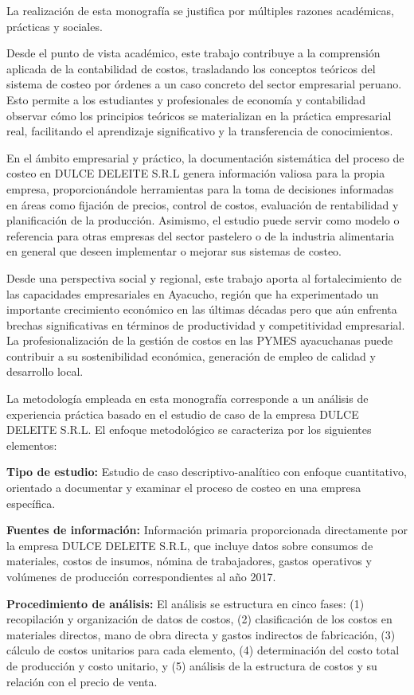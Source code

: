 \documentclass[
  stu,
  floatsintext,
  longtable,
  a4paper,
  nolmodern,
  notxfonts,
  notimes,
  12pt,
  colorlinks=true,linkcolor=blue,citecolor=blue,urlcolor=blue]{apa7}
\begin{document}
La realización de esta monografía se justifica por múltiples razones
académicas, prácticas y sociales.

Desde el punto de vista académico, este trabajo contribuye a la
comprensión aplicada de la contabilidad de costos, trasladando los
conceptos teóricos del sistema de costeo por órdenes a un caso concreto
del sector empresarial peruano. Esto permite a los estudiantes y
profesionales de economía y contabilidad observar cómo los principios
teóricos se materializan en la práctica empresarial real, facilitando el
aprendizaje significativo y la transferencia de conocimientos.

En el ámbito empresarial y práctico, la documentación sistemática del
proceso de costeo en DULCE DELEITE S.R.L genera información valiosa para
la propia empresa, proporcionándole herramientas para la toma de
decisiones informadas en áreas como fijación de precios, control de
costos, evaluación de rentabilidad y planificación de la producción.
Asimismo, el estudio puede servir como modelo o referencia para otras
empresas del sector pastelero o de la industria alimentaria en general
que deseen implementar o mejorar sus sistemas de costeo.

Desde una perspectiva social y regional, este trabajo aporta al
fortalecimiento de las capacidades empresariales en Ayacucho, región que
ha experimentado un importante crecimiento económico en las últimas
décadas pero que aún enfrenta brechas significativas en términos de
productividad y competitividad empresarial. La profesionalización de la
gestión de costos en las PYMES ayacuchanas puede contribuir a su
sostenibilidad económica, generación de empleo de calidad y desarrollo
local.

La metodología empleada en esta monografía corresponde a un análisis de
experiencia práctica basado en el estudio de caso de la empresa DULCE
DELEITE S.R.L. El enfoque metodológico se caracteriza por los siguientes
elementos:

\textbf{Tipo de estudio:} Estudio de caso descriptivo-analítico con
enfoque cuantitativo, orientado a documentar y examinar el proceso de
costeo en una empresa específica.

\textbf{Fuentes de información:} Información primaria proporcionada
directamente por la empresa DULCE DELEITE S.R.L, que incluye datos sobre
consumos de materiales, costos de insumos, nómina de trabajadores,
gastos operativos y volúmenes de producción correspondientes al año
2017.

\textbf{Procedimiento de análisis:} El análisis se estructura en cinco
fases: (1) recopilación y organización de datos de costos, (2)
clasificación de los costos en materiales directos, mano de obra directa
y gastos indirectos de fabricación, (3) cálculo de costos unitarios para
cada elemento, (4) determinación del costo total de producción y costo
unitario, y (5) análisis de la estructura de costos y su relación con el
precio de venta.
\end{document}

